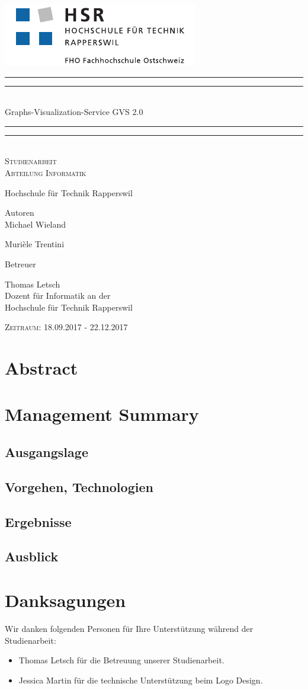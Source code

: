 \documentclass[11pt,a4paper,english,oneside]{book}
\newcommand*{\plogo}{\includegraphics{logo_hsr.pdf}}
\numberwithin{equation}{chapter}
\newcommand*{\titleGP}{\begingroup %
	\centering %
	\vspace*{\baselineskip} %
	\plogo\\[2\baselineskip] %
	\rule{\textwidth}{1.6pt}\vspace*{-\baselineskip}\vspace*{2pt} %
	\rule{\textwidth}{0.4pt}\\[\baselineskip] %
	{\LARGE Graphs-Visualization-Service GVS 2.0 }\\[0.2\baselineskip] %
	\rule{\textwidth}{0.4pt}\vspace*{-\baselineskip}\vspace{3.2pt} %
	\rule{\textwidth}{1.6pt}\\[2\baselineskip] %
	\scshape %
	\large Studienarbeit \\[2\baselineskip]
	Abteilung Informatik \par
	Hochschule für Technik Rapperswil
	\vspace*{2\baselineskip}
	
	
	Autoren\\
	{\Large  Michael Wieland  \\ [5pt]}
	
	{\Large Murièle Trentini \\ [5pt]}
	
	\vspace*{2\baselineskip}
	Betreuer\\
	{\Large Thomas Letsch  \\[5pt]
		\small Dozent für Informatik an der \\[5pt]Hochschule für Technik Rapperswil\par}
	\vspace*{2\baselineskip}
	
	\vfill
	{\scshape Zeitraum: 18.09.2017 - 22.12.2017} \\[0.3\baselineskip]
	\endgroup}
\begin{document}
	\thispagestyle{empty}
	\titleGP
	\newpage
	\doublespacing
	\setcounter{page}{1}
	\section*{Abstract}
	\thispagestyle{firststyle}
	
	
	\newpage
	
	\section*{Management Summary}
	\thispagestyle{firststyle}
	
	\subsection*{Ausgangslage}
	
	\subsection*{Vorgehen, Technologien}
	
	\subsection*{Ergebnisse}
	
	\subsection*{Ausblick}
	
	\newpage
	
	\section*{Danksagungen}
	\thispagestyle{firststyle}
	
	Wir danken folgenden Personen für Ihre Unterstützung während der Studienarbeit:
	
	\begin{itemize}
		\item Thomas Letsch für die Betreuung unserer Studienarbeit.
		\item Jessica Martin für die technische Unterstützung beim Logo Design.
	\end{itemize}
	

	{
		\hypersetup{linkcolor=black}
		\tableofcontents
	}

	
\end{document}
